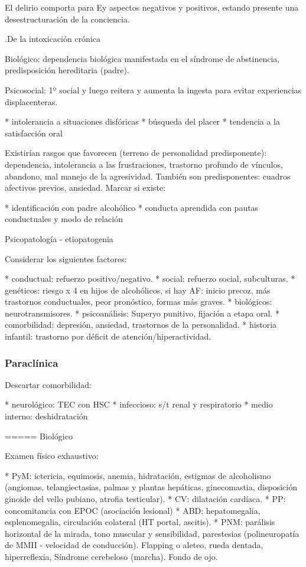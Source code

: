 \documentclass[encares.tex]{subfiles}
\begin{document}
El delirio comporta para Ey aspectos negativos y positivos, estando presente una desestructuración de la conciencia.

.De la intoxicación crónica

Biológico: dependencia biológica manifestada en el síndrome de abstinencia, predisposición hereditaria (padre).

Psicosocial: 1º social y luego reitera y aumenta la ingesta para evitar experiencias displacenteras.

* intolerancia a situaciones disfóricas
* búsqueda del placer
* tendencia a la satisfacción oral

Existirían rasgos que favorecen (terreno de personalidad predisponente): dependencia, intolerancia a las frustraciones, trastorno profundo de vínculos, abandono, mal manejo de la agresividad. También son predisponentes: cuadros afectivos previos, ansiedad. Marcar si existe:

* identificación con padre alcohólico
* conducta aprendida con pautas conductuales y modo de relación

Psicopatología - etiopatogenia

Considerar los siguientes factores:

* conductual: refuerzo positivo/negativo.
* social: refuerzo social, subculturas.
* genéticos: riesgo x 4 en hijos de alcohólicos, si hay AF: inicio precoz, más trastornos conductuales, peor pronóstico, formas más graves.
* biológicos: neurotransmisores.
* psicoanálisis: Superyo punitivo, fijación a etapa oral.
* comorbilidad: depresión, ansiedad, trastornos de la personalidad.
* historia infantil: trastorno por déficit de atención/hiperactividad.

\subsubsection*{Paraclínica}

Descartar comorbilidad:

* neurológico: TEC con HSC
* infeccioso: s/t renal y respiratorio
* medio interno: deshidratación

===== Biológico

Examen físico exhaustivo:

* PyM: ictericia, equimosis, anemia, hidratación, estigmas de alcoholismo (angiomas, telangiectasias, palmas y plantas hepáticas, ginecomastia, disposición ginoide del vello pubiano, atrofia testicular).
* CV: dilatación cardíaca.
* PP: concomitancia con EPOC (asociación lesional)
* ABD: hepatomegalia, esplenomegalia, circulación colateral (HT portal, ascitis).
* PNM: parálisis horizontal de la mirada, tono muscular y sensibilidad, parestesias (polineuropatía de MMII - velocidad de conducción). Flapping o aleteo, rueda dentada, hiperreflexia, Síndrome cerebeloso (marcha). Fondo de ojo.
\end{document}
